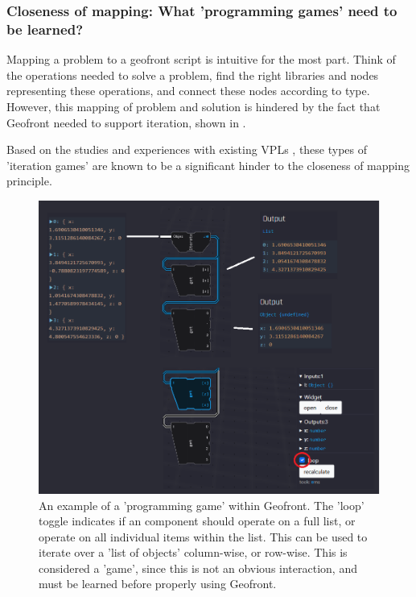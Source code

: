 
\subsubsection*{Closeness of mapping: What 'programming games' need to be learned?}

Mapping a problem to a geofront script is intuitive for the most part.
Think of the operations needed to solve a problem, 
find the right libraries and nodes representing these operations,
and connect these nodes according to type. 
However, this mapping of problem and solution is hindered by the fact that Geofront needed to support iteration, shown in . 

Based on the studies and experiences with existing VPLs , these types of 'iteration games' are known to be a significant hinder to the closeness of mapping principle.

\begin{figure}
  \graphicspath{{../../assets/images/6.2/}}
  \centering
  \includegraphics[width=\linewidth]{programming-game.PNG}
  \caption[]{An example of a 'programming game' within Geofront. The 'loop' toggle  indicates if an component should operate on a full list, or operate on all individual items within the list. 
  This can be used to iterate over a 'list of objects' column-wise, or row-wise. This is considered a 'game', since this is not an obvious interaction, and must be learned before properly using Geofront. }
  \label{fig:programming-game}
\end{figure}
 


